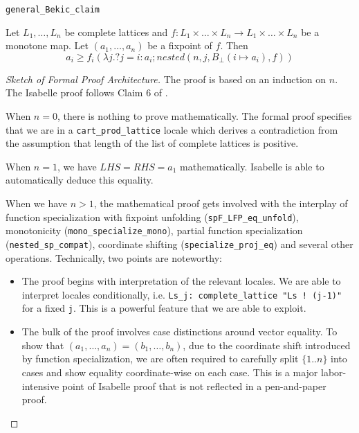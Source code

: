 \begin{blemma}
\texttt{general\_Bekic\_claim}
    \label{lem:nested_ineq}
    
    Let $L_1,\dots,L_n$ be complete lattices and $f:L_1\times\dots\times L_n\rightarrow L_1\times\dots\times L_n$ be a monotone map. Let $(a_1,\dots,a_n)$ be a fixpoint of $f$. Then 
    \begin{equation}
        \label{eqn:nested_ineq}
        a_i\geq f_i(\lambda j. ?j=i:a_i; nested(n,j,B_\bot (i\mapsto a_i),f))
    \end{equation}
\end{blemma}
\begin{proof}[Sketch of Formal Proof Architecture]
    The proof is based on an induction on $n$. The Isabelle proof follows Claim 6 of \cite{xu2025}.

    When $n=0$, there is nothing to prove mathematically. The formal proof specifies that we are in a \texttt{cart\_prod\_lattice} locale which derives a contradiction from the assumption that length of the list of complete lattices is positive.

    When $n=1$, we have $LHS = RHS = a_1$ mathematically. Isabelle is able to automatically deduce this equality.

    When we have $n>1$, the mathematical proof gets involved with the interplay of function specialization with fixpoint unfolding (\texttt{spF\_LFP\_eq\_unfold}), monotonicity (\texttt{mono\_specialize\_mono}), partial function specialization (\texttt{nested\_sp\_compat}), coordinate shifting (\texttt{specialize\_proj\_eq}) and several other operations. Technically, two points are noteworthy:

    \begin{itemize}
        \item The proof begins with interpretation of the relevant locales. We are able to interpret locales conditionally, i.e. \texttt{Ls\_j: complete\_lattice "Ls ! (j-1)"} for a fixed \texttt{j}. This is a powerful feature that we are able to exploit.
        \item The bulk of the proof involves case distinctions around vector equality. To show that $(a_1,\dots,a_n)=(b_1,\dots,b_n)$, due to the coordinate shift introduced by function specialization, we are often required to carefully split $\{1..n\}$ into cases and show equality coordinate-wise on each case. This is a major labor-intensive point of Isabelle proof that is not reflected in a pen-and-paper proof.
    \end{itemize}
\end{proof}

